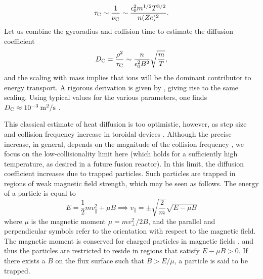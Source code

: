 \begin{equation*}
    \tau_{\rm C} \sim  \frac{1}{\nu_{\rm C}} \sim \frac{\epsilon_0^2 m^{1/2} T^{3/2}}{n (Ze)^2}.
\end{equation*}
Let us combine the gyroradius and collision time to estimate the diffusion coefficient
\begin{equation}
    D_{\rm C} = \frac{\rho^2}{\tau_{\rm C}} \sim \frac{n}{\epsilon_0^2 B^2} \sqrt{\frac{m}{T}},
\end{equation}
and the scaling with mass implies that ions will be the dominant contributor to energy transport. A rigorous derivation is given by \citet{braginskii1958transport}, giving rise to the same scaling. Using typical values for the various parameters, one finds $D_{\rm C} \approx 10^{-3} \: {\rm m^2/s}$ \cite[p.~465]{freidberg2008plasma}. \par 
This classical estimate of heat diffusion is too optimistic, however, as step size and collision frequency increase in toroidal devices \cite[Ch.~7]{helander2005collisional}. Although the precise increase, in general, depends on the magnitude of the collision frequency \cite{hinton1976theory}, we focus on the low-collisionality limit here (which holds for a sufficiently high temperature, as desired in a future fusion reactor). In this limit, the diffusion coefficient increases due to trapped particles. Such particles are trapped in regions of weak magnetic field strength, which may be seen as follows. The energy of a particle is equal to
\begin{equation}
    E = \frac{1}{2}mv_\parallel^2 +  \mu B \implies v_\parallel = \pm \sqrt{\frac{2}{m}}\sqrt{E - \mu B}
    \label{eq: v par}
\end{equation}
where $\mu$ is the magnetic moment $\mu = mv_\perp^2/2B$, and the parallel and perpendicular symbols refer to the orientation with respect to the magnetic field. The magnetic moment is conserved for charged particles in magnetic fields \cite{littlejohn1983variational}, and thus the particles are restricted to reside in regions that satisfy $E - \mu B > 0$. If there exists a $B$ on the flux surface such that $B > E/\mu $, a particle is said to be trapped. \par
